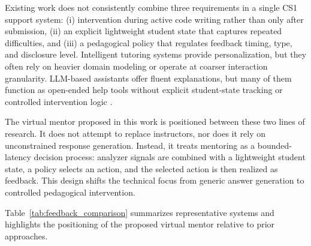 \documentclass[conference]{IEEEtran}
\begin{document}
Existing work does not consistently combine three requirements in a single CS1 support system: (i) intervention during active code writing rather than only after submission, (ii) an explicit lightweight student state that captures repeated difficulties, and (iii) a pedagogical policy that regulates feedback timing, type, and disclosure level. Intelligent tutoring systems provide personalization, but they often rely on heavier domain modeling or operate at coarser interaction granularity. LLM-based assistants offer fluent explanations, but many of them function as open-ended help tools without explicit student-state tracking or controlled intervention logic \cite{ProgTutor,NavigatingAutomatedFeedback,CodeAid,IRIS}.

The virtual mentor proposed in this work is positioned between these two lines of research. It does not attempt to replace instructors, nor does it rely on unconstrained response generation. Instead, it treats mentoring as a bounded-latency decision process: analyzer signals are combined with a lightweight student state, a policy selects an action, and the selected action is then realized as feedback. This design shifts the technical focus from generic answer generation to controlled pedagogical intervention.

Table~\ref{tab:feedback_comparison} summarizes representative systems and highlights the positioning of the proposed virtual mentor relative to prior approaches.
\end{document}
